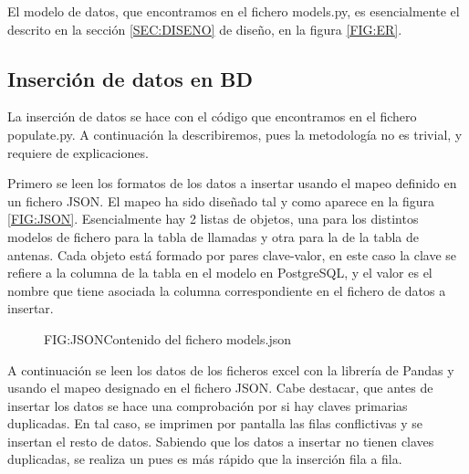       El modelo de datos, que encontramos en el fichero models.py, es esencialmente el descrito en la sección \ref{SEC:DISENO} de diseño, en la figura \ref{FIG:ER}.
    
    
    \subsection{Inserción de datos en BD\label{SS:IDAT}}
      La inserción de datos se hace con el código que encontramos en el fichero populate.py. A continuación la describiremos, pues la metodología no es trivial, y requiere de explicaciones.
      
      Primero se leen los formatos de los datos a insertar usando el mapeo definido en un fichero JSON.
      El mapeo ha sido diseñado tal y como aparece en la figura \ref{FIG:JSON}. Esencialmente hay 2 listas de objetos, una para los distintos modelos de fichero para la tabla de llamadas y otra para la de la tabla de antenas.
      Cada objeto está formado por pares clave-valor, en este caso la clave se refiere a la columna de la tabla en el modelo en PostgreSQL, y el valor es el nombre que tiene asociada la columna correspondiente en el fichero de datos a insertar.
      
      \begin{figure}[Contenido del fichero models.json]{FIG:JSON}{Contenido del fichero models.json}
      \end{figure}
    
      A continuación se leen los datos de los ficheros excel con la librería de Pandas y usando el mapeo designado en el fichero JSON.
      Cabe destacar, que antes de insertar los datos se hace una comprobación por si hay claves primarias duplicadas. En tal caso, se imprimen por pantalla las filas conflictivas y se insertan el resto de datos.
      Sabiendo que los datos a insertar no tienen claves duplicadas, se realiza un  pues es más rápido que la inserción fila a fila.
